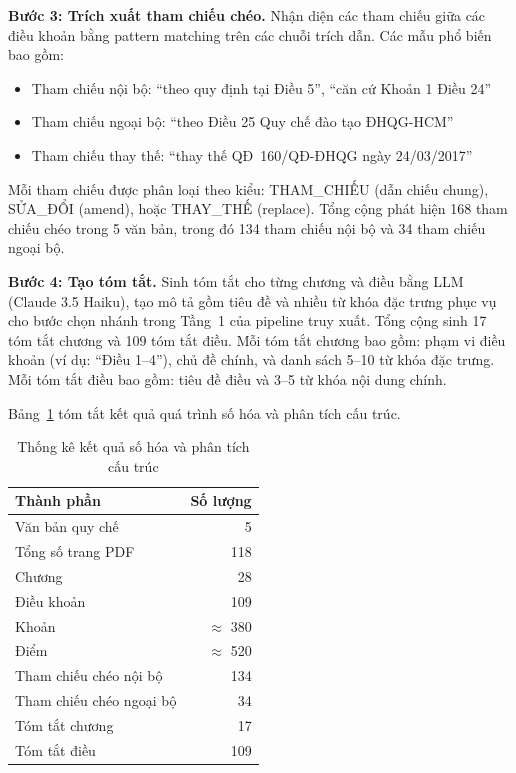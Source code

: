 \textbf{Bước 3: Trích xuất tham chiếu chéo.}
Nhận diện các tham chiếu giữa các điều khoản bằng pattern matching trên các chuỗi
trích dẫn. Các mẫu phổ biến bao gồm:

\begin{itemize}
  \item Tham chiếu nội bộ: ``theo quy định tại Điều 5'', ``căn cứ Khoản 1 Điều 24''
  \item Tham chiếu ngoại bộ: ``theo Điều 25 Quy chế đào tạo ĐHQG-HCM''
  \item Tham chiếu thay thế: ``thay thế QĐ~160/QĐ-ĐHQG ngày 24/03/2017''
\end{itemize}

Mỗi tham chiếu được phân loại theo kiểu: THAM\_CHIẾU (dẫn chiếu chung), SỬA\_ĐỔI
(amend), hoặc THAY\_THẾ (replace). Tổng cộng phát hiện 168 tham chiếu chéo trong 5
văn bản, trong đó 134 tham chiếu nội bộ và 34 tham chiếu ngoại bộ.

\textbf{Bước 4: Tạo tóm tắt.}
Sinh tóm tắt cho từng chương và điều bằng LLM (Claude 3.5 Haiku), tạo mô tả gồm
tiêu đề và nhiều từ khóa đặc trưng phục vụ cho bước chọn nhánh trong Tầng~1 của
pipeline truy xuất. Tổng cộng sinh 17 tóm tắt chương và 109 tóm tắt điều. Mỗi tóm
tắt chương bao gồm: phạm vi điều khoản (ví dụ: ``Điều 1--4''), chủ đề chính, và
danh sách 5--10 từ khóa đặc trưng. Mỗi tóm tắt điều bao gồm: tiêu đề điều và 3--5
từ khóa nội dung chính.

Bảng~\ref{tab:thongke_sohoa} tóm tắt kết quả quá trình số hóa và phân tích cấu
trúc.

\begin{table}[htbp]
    \centering
    \caption{Thống kê kết quả số hóa và phân tích cấu trúc}
    \label{tab:thongke_sohoa}
    \begin{tabular}{lr}
        \toprule
        \textbf{Thành phần} & \textbf{Số lượng} \\
        \midrule
        Văn bản quy chế       & 5 \\
        Tổng số trang PDF     & 118 \\
        Chương                & 28 \\
        Điều khoản            & 109 \\
        Khoản                 & $\approx$ 380 \\
        Điểm                  & $\approx$ 520 \\
        Tham chiếu chéo nội bộ & 134 \\
        Tham chiếu chéo ngoại bộ & 34 \\
        Tóm tắt chương        & 17 \\
        Tóm tắt điều          & 109 \\
        \bottomrule
    \end{tabular}
\end{table}

